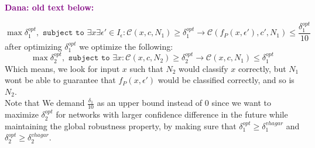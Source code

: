 \documentclass[11pt]{article}
\newcommand{\Dana}[1]{\textcolor{purple}{\bf Dana: #1}}
\begin{document}
   \Dana{old text below:}
   
$$\max{\delta_1^{opt}}, \texttt{ subject to } \exists{x}\exists{\epsilon'}\in{I_\epsilon}: \mathcal{C}(x,c,N_1) \geq \delta_1^{opt} \rightarrow \mathcal{C}(f_P(x,\epsilon'),c',N_1)\leq \frac{\delta_1^{opt}}{10} $$
after optimizing $\delta_1^{opt}$ we optimize the following:
$$\max{\delta_2^{opt}}, \texttt{ subject to }  \exists{x}:  \mathcal{C}(x,c,N_2) \geq \delta_2^{opt} \rightarrow \mathcal{C}(x,c,N_1)\leq \delta_1^{opt}$$
Which means, we look for input $x$ such that $N_2$ would classify $x$ correctly, but $N_1$ wont be able to guarantee that $f_P(x,\epsilon')$ would be classified correctly, and so is $N_2$. 
\\
Note that We demand $\frac{\delta_1}{10}$ as an upper bound instead of $0$ since we want to maximize $\delta_2^{opt}$ for networks with larger confidence difference in the future while maintaining the global robustness property, by making sure that $\delta_1^{opt} \geq \delta^{vhagar}_1$ and $\delta_2^{opt} \geq \delta^{vhagar}_2$.
\end{document}
